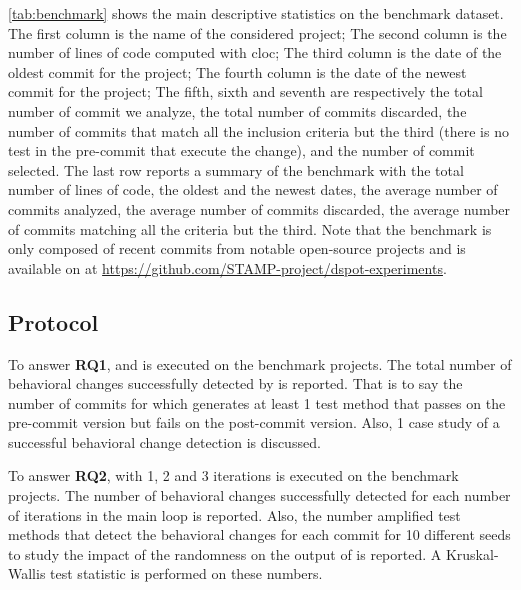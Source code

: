 \autoref{tab:benchmark} shows the main descriptive statistics on the benchmark dataset.
The first column is the name of the considered project;
The second column is the number of lines of code computed with cloc;
The third column is the date of the oldest commit for the project;
The fourth column is the date of the newest commit for the project;
The fifth, sixth and seventh are respectively the total number of commit we analyze, the total number of commits discarded, the number of commits that match all the inclusion criteria but the third (there is no test in the pre-commit that execute the change), and the number of commit selected.
The last row reports a summary of the benchmark with the total number of lines of code, the oldest and the newest dates, the average number of commits analyzed, the average number of commits discarded, the average number of commits matching all the criteria but the third.
Note that the benchmark is only composed of recent commits from notable open-source projects and is available on \gh at \url{https://github.com/STAMP-project/dspot-experiments}.

\subsection{Protocol}
\label{subsec:dci:evaluation:protocol}

To answer \textbf{RQ1}, \DCIA and \DCII is executed on the benchmark projects.
The total number of behavioral changes successfully detected by \DCI is reported.
That is to say the number of commits for which \DCI generates at least 1 test method that passes on the pre-commit version but fails on the post-commit version.
Also, 1 case study of a successful behavioral change detection is discussed.

To answer \textbf{RQ2}, \DCII with 1, 2 and 3 iterations is executed on the benchmark projects.
The number of behavioral changes successfully detected for each number of iterations in the main loop is reported.
Also, the number amplified test methods that detect the behavioral changes for each commit for 10 different seeds to study the impact of the randomness on the output of \dspot is reported.
A Kruskal-Wallis test statistic is performed on these numbers.

